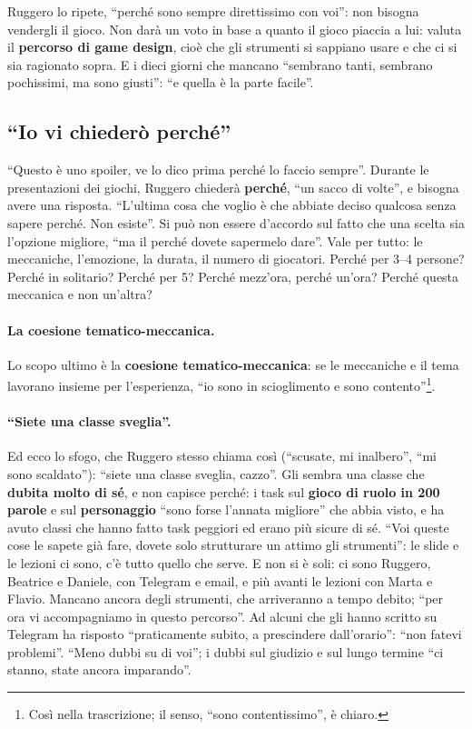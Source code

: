 Ruggero lo ripete, ``perché sono sempre direttissimo con voi'': non bisogna vendergli
il gioco. Non darà un voto in base a quanto il gioco piaccia a lui: valuta il
\textbf{percorso di game design}, cioè che gli strumenti si sappiano usare e che ci si
sia ragionato sopra. E i dieci giorni che mancano ``sembrano tanti, sembrano pochissimi,
ma sono giusti'': ``e quella è la parte facile''.

\subsection{``Io vi chiederò perché''}
\label{a7:sec:tut-perche}

``Questo è uno spoiler, ve lo dico prima perché lo faccio sempre''. Durante le
presentazioni dei giochi, Ruggero chiederà \textbf{perché}, ``un sacco di volte'', e
bisogna avere una risposta. ``L'ultima cosa che voglio è che abbiate deciso qualcosa
senza sapere perché. Non esiste''. Si può non essere d'accordo sul fatto che una scelta
sia l'opzione migliore, ``ma il perché dovete sapermelo dare''. Vale per tutto: le
meccaniche, l'emozione, la durata, il numero di giocatori. Perché per 3--4 persone?
Perché in solitario? Perché per 5? Perché mezz'ora, perché un'ora? Perché questa
meccanica e non un'altra?

\paragraph{La coesione tematico-meccanica.} Lo scopo ultimo è la \textbf{coesione
tematico-meccanica}: se le meccaniche e il tema lavorano insieme per l'esperienza,
``io sono in scioglimento e sono contento''\footnote{Così nella trascrizione;
il senso, ``sono contentissimo'', è chiaro.}.

\paragraph{``Siete una classe sveglia''.} Ed ecco lo sfogo, che Ruggero stesso chiama
così (``scusate, mi inalbero'', ``mi sono scaldato''): ``siete una classe sveglia,
cazzo''. Gli sembra una classe che \textbf{dubita molto di sé}, e non capisce perché:
i task sul \textbf{gioco di ruolo in 200 parole} e sul \textbf{personaggio} ``sono forse
l'annata migliore'' che abbia visto, e ha avuto classi che hanno fatto task peggiori
ed erano più sicure di sé. ``Voi queste cose le sapete già fare, dovete solo
strutturare un attimo gli strumenti'': le slide e le lezioni ci sono, c'è tutto quello
che serve. E non si è soli: ci sono Ruggero, Beatrice e Daniele, con Telegram e email,
e più avanti le lezioni con Marta e Flavio. Mancano ancora degli strumenti, che
arriveranno a tempo debito; ``per ora vi accompagniamo in questo percorso''. Ad alcuni
che gli hanno scritto su Telegram ha risposto ``praticamente subito, a prescindere
dall'orario'': ``non fatevi problemi''. ``Meno dubbi su di voi''; i dubbi sul giudizio
e sul lungo termine ``ci stanno, state ancora imparando''.

